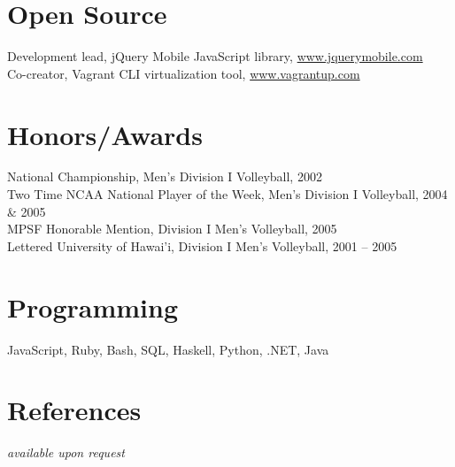 \documentclass[margin,line]{resume}
\begin{document}
\begin{resume}
  \section{\mysidestyle Open Source}

  Development lead, jQuery Mobile JavaScript library, \url{www.jquerymobile.com} \vspace{1mm}\\
  Co-creator, Vagrant CLI virtualization tool, \url{www.vagrantup.com}

  \section{\mysidestyle Honors/Awards}
  National Championship, Men's Division I Volleyball, 2002\vspace{1mm}\\
  Two Time NCAA National Player of the Week, Men's Division I Volleyball, 2004 \& 2005\vspace{1mm}\\
  MPSF Honorable Mention, Division I Men's Volleyball, 2005\vspace{1mm}\\
  Lettered University of Hawai'i, Division I Men's Volleyball, 2001 -- 2005

  \section{\mysidestyle Programming}
  JavaScript, Ruby, Bash, SQL, Haskell, Python, .NET, Java

  \section{\mysidestyle References}
  \textsl{available upon request}

\end{resume}
\end{document}
